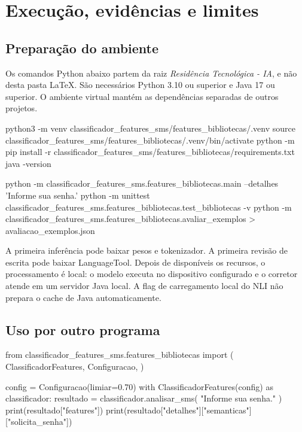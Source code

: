 \section{Execução, evidências e limites}
\subsection{Preparação do ambiente}
Os comandos Python abaixo partem da raiz \textit{Residência Tecnológica - IA}, e não desta pasta LaTeX. São necessários Python 3.10 ou superior e Java 17 ou superior. O ambiente virtual mantém as dependências separadas de outros projetos.

\begin{codigofonte}
python3 -m venv classificador_features_sms/features_bibliotecas/.venv
source classificador_features_sms/features_bibliotecas/.venv/bin/activate
python -m pip install -r classificador_features_sms/features_bibliotecas/requirements.txt
java -version
\end{codigofonte}

\begin{codigofonte}
python -m classificador_features_sms.features_bibliotecas.main --detalhes 'Informe sua senha.'
python -m unittest classificador_features_sms.features_bibliotecas.test_bibliotecas -v
python -m classificador_features_sms.features_bibliotecas.avaliar_exemplos > avaliacao_exemplos.json
\end{codigofonte}

A primeira inferência pode baixar pesos e tokenizador. A primeira revisão de escrita pode baixar LanguageTool. Depois de disponíveis os recursos, o processamento é local: o modelo executa no dispositivo configurado e o corretor atende em um servidor Java local. A flag de carregamento local do NLI não prepara o cache de Java automaticamente.

\subsection{Uso por outro programa}
\begin{codigofonte}
from classificador_features_sms.features_bibliotecas import (
    ClassificadorFeatures, Configuracao,
)

config = Configuracao(limiar=0.70)
with ClassificadorFeatures(config) as classificador:
    resultado = classificador.analisar_sms(
        "Informe sua senha."
    )
    print(resultado["features"])
    print(resultado["detalhes"]["semanticas"]["solicita_senha"])
\end{codigofonte}


